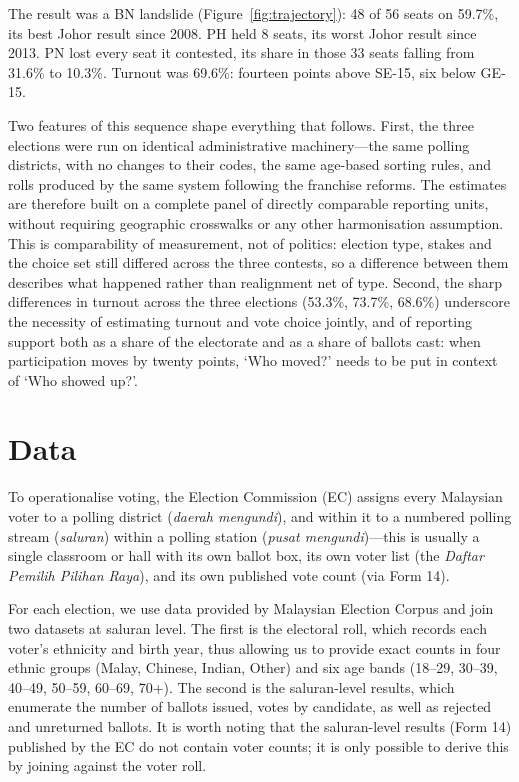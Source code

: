 \documentclass[11pt]{article}
\begin{document}
The result was a BN landslide (Figure~\ref{fig:trajectory}): 48 of 56 seats on 59.7\%, its best Johor result since 2008. PH held 8 seats, its worst Johor result since 2013. PN lost every seat it contested, its share in those 33 seats falling from 31.6\% to 10.3\%. Turnout was 69.6\%: fourteen points above SE-15, six below GE-15.

Two features of this sequence shape everything that follows. First, the three elections were run on identical administrative machinery---the same polling districts, with no changes to their codes, the same age-based sorting rules, and rolls produced by the same system following the franchise reforms. The estimates are therefore built on a complete panel of directly comparable reporting units, without requiring geographic crosswalks or any other harmonisation assumption. This is comparability of measurement, not of politics: election type, stakes and the choice set still differed across the three contests, so a difference between them describes what happened rather than realignment net of type. Second, the sharp differences in turnout across the three elections (53.3\%, 73.7\%, 68.6\%) underscore the necessity of estimating turnout and vote choice jointly, and of reporting support both as a share of the electorate and as a share of ballots cast: when participation moves by twenty points, `Who moved?' needs to be put in context of `Who showed up?'.

\section{Data}
\label{sec:data}

To operationalise voting, the Election Commission (EC) assigns every Malaysian voter to a polling district (\emph{daerah mengundi}), and within it to a numbered polling stream (\emph{saluran}) within a polling station (\emph{pusat mengundi})---this is usually a single classroom or hall with its own ballot box, its own voter list (the \emph{Daftar Pemilih Pilihan Raya}), and its own published vote count (via Form 14).

For each election, we use data provided by Malaysian Election Corpus \cite{meco1} and join two datasets at saluran level. The first is the electoral roll, which records each voter's ethnicity and birth year, thus allowing us to provide exact counts in four ethnic groups (Malay, Chinese, Indian, Other) and six age bands (18--29, 30--39, 40--49, 50--59, 60--69, 70+). The second is the saluran-level results, which enumerate the number of ballots issued, votes by candidate, as well as rejected and unreturned ballots. It is worth noting that the saluran-level results (Form 14) published by the EC do not contain voter counts; it is only possible to derive this by joining against the voter roll.
\end{document}
